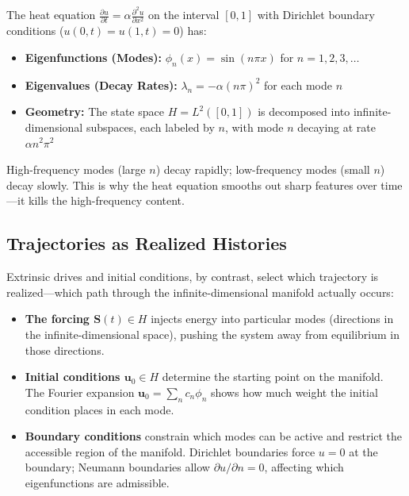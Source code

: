 \documentclass[
]{article}
\providecommand{\tightlist}{%
  \setlength{\itemsep}{0pt}\setlength{\parskip}{0pt}}
\begin{document}
The heat equation
\(\frac{\partial u}{\partial t} = \alpha \frac{\partial^2 u}{\partial x^2}\)
on the interval \([0,1]\) with Dirichlet boundary conditions
(\(u(0,t) = u(1,t) = 0\)) has:

\begin{itemize}
\tightlist
\item
  \textbf{Eigenfunctions (Modes):} \(\phi_n(x) = \sin(n\pi x)\) for
  \(n = 1, 2, 3, \ldots\)
\item
  \textbf{Eigenvalues (Decay Rates):} \(\lambda_n = -\alpha (n\pi)^2\)
  for each mode \(n\)
\item
  \textbf{Geometry:} The state space \(H = L^2([0,1])\) is decomposed
  into infinite-dimensional subspaces, each labeled by \(n\), with mode
  \(n\) decaying at rate \(\alpha n^2 \pi^2\)
\end{itemize}

High-frequency modes (large \(n\)) decay rapidly; low-frequency modes
(small \(n\)) decay slowly. This is why the heat equation smooths out
sharp features over time---it kills the high-frequency content.

\subsection{Trajectories as Realized
Histories}\label{trajectories-as-realized-histories}

Extrinsic drives and initial conditions, by contrast, select which
trajectory is realized---which path through the infinite-dimensional
manifold actually occurs:

\begin{itemize}
\item
  \textbf{The forcing \(\mathbf{S}(t) \in H\)} injects energy into
  particular modes (directions in the infinite-dimensional space),
  pushing the system away from equilibrium in those directions.
\item
  \textbf{Initial conditions \(\mathbf{u}_0 \in H\)} determine the
  starting point on the manifold. The Fourier expansion
  \(\mathbf{u}_0 = \sum_n c_n \phi_n\) shows how much weight the initial
  condition places in each mode.
\item
  \textbf{Boundary conditions} constrain which modes can be active and
  restrict the accessible region of the manifold. Dirichlet boundaries
  force \(u = 0\) at the boundary; Neumann boundaries allow
  \(\partial u/\partial n = 0\), affecting which eigenfunctions are
  admissible.
\end{itemize}
\end{document}
